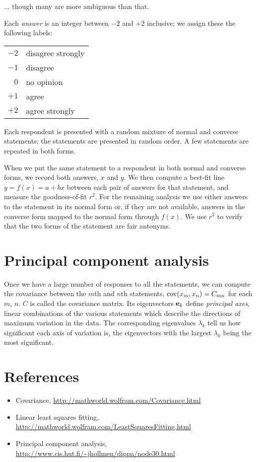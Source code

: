 \documentclass[a4paper,12pt]{article}
\newcommand\cov{{\rm cov}}
\begin{document}
... though many are more ambiguous than that.

Each {\em answer} is an integer between $-2$ and $+2$ inclusive; we assign these
the following labels:

\begin{tabular}{rl}
$-2$    &       disagree strongly   \\
$-1$    &       disagree            \\
$ 0$    &       no opinion          \\
$+1$    &       agree               \\
$+2$    &       agree strongly      \\
\end{tabular}

Each respondent is presented with a random mixture of normal and converse
statements; the statements are presented in random order. A few statements are
repeated in both forms.

When we put the same statement to a respondent in both normal and converse
forms, we record both answers, $x$ and $y$. We then compute a best-fit line
$y = f(x) = a + bx$ between each pair of answers for that statement, and
measure the goodness-of-fit $r^2$. For the remaining analysis we use either
answers to the statement in its normal form or, if they are not available,
answers in the converse form mapped to the normal form through $f(x)$. We use
$r^2$ to verify that the two forms of the statement are fair antonyms.

\section{Principal component analysis}

Once we have a large number of responses to all the statements, we can compute
the covariance between the $m$th and $n$th statements,
$\cov(x_m, x_n) = C_{mn}$ for each $m$, $n$. $C$ is called the covariance
matrix. Its eigenvectors ${\bf e}_k$ define {\em principal axes}, linear
combinations of the various statements which describe the directions of maximum
variation in the data. The corresponding eigenvalues $\lambda_k$ tell us how
significant each axis of variation is, the eigenvectors with the largest
$\lambda_k$ being the most significant.

\section{References}

\begin{itemize}
\item{Covariance, \url{http://mathworld.wolfram.com/Covariance.html}}
\item{Linear least squares fitting, \url{http://mathworld.wolfram.com/LeastSquaresFitting.html}}
\item{Principal component analysis, \url{http://www.cis.hut.fi/~jhollmen/dippa/node30.html}}
\end{itemize}
\end{document}
